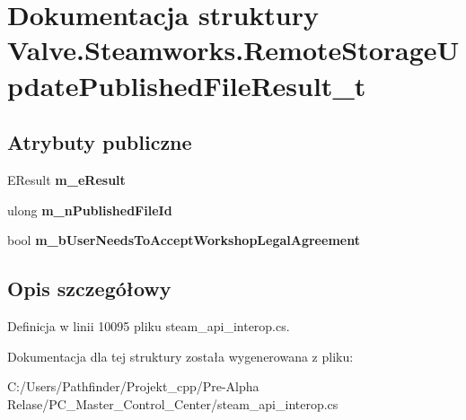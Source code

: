 \hypertarget{struct_valve_1_1_steamworks_1_1_remote_storage_update_published_file_result__t}{}\section{Dokumentacja struktury Valve.\+Steamworks.\+Remote\+Storage\+Update\+Published\+File\+Result\+\_\+t}
\label{struct_valve_1_1_steamworks_1_1_remote_storage_update_published_file_result__t}
\subsection*{Atrybuty publiczne}
\begin{DoxyCompactItemize}
\item 
\mbox{\label{struct_valve_1_1_steamworks_1_1_remote_storage_update_published_file_result__t_ab90e1ee3b755ed48c079e18f1a7f6c90}} 
E\+Result {\bfseries m\+\_\+e\+Result}
\item 
\mbox{\label{struct_valve_1_1_steamworks_1_1_remote_storage_update_published_file_result__t_abe65c11bc6634c3ea94447356e7679de}} 
ulong {\bfseries m\+\_\+n\+Published\+File\+Id}
\item 
\mbox{\label{struct_valve_1_1_steamworks_1_1_remote_storage_update_published_file_result__t_a31737efd69f00928f41c823766b71fe5}} 
bool {\bfseries m\+\_\+b\+User\+Needs\+To\+Accept\+Workshop\+Legal\+Agreement}
\end{DoxyCompactItemize}


\subsection{Opis szczegółowy}


Definicja w linii 10095 pliku steam\+\_\+api\+\_\+interop.\+cs.



Dokumentacja dla tej struktury została wygenerowana z pliku\+:\begin{DoxyCompactItemize}
\item 
C\+:/\+Users/\+Pathfinder/\+Projekt\+\_\+cpp/\+Pre-\/\+Alpha Relase/\+P\+C\+\_\+\+Master\+\_\+\+Control\+\_\+\+Center/steam\+\_\+api\+\_\+interop.\+cs\end{DoxyCompactItemize}
